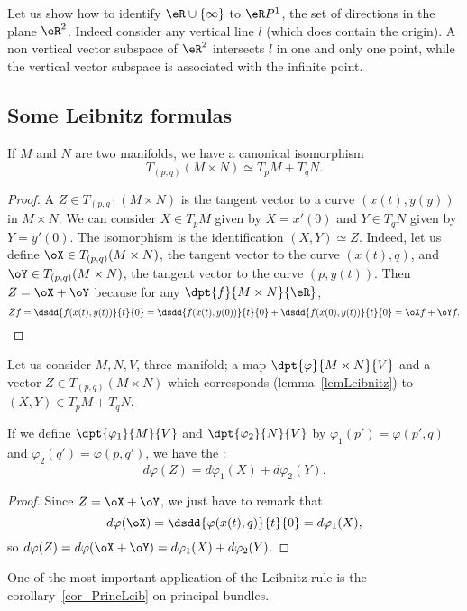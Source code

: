 Let us show how to identify $\eR\cup\{ \infty \}$ to $\eR P^1$, the set of directions in the plane $\eR^2$. Indeed consider any vertical line $l$ (which does contain the origin). A non vertical vector subspace of $\eR^2$ intersects $l$ in one and only one point, while the vertical vector subspace is associated with the infinite point.

\subsection{Some Leibnitz formulas}

\begin{lemma}
If $M$ and $N$ are two manifolds, we have a canonical isomorphism
\[
     T_{(p,q)}(M\times N)\simeq T_pM+T_qN.
\]
\label{lemLeibnitz}
\end{lemma}

\begin{proof}
A $Z\in T_{(p,q)}(M\times N)$ is the tangent vector to a curve $(x(t),y(y))$ in $M\times N$. We can consider $X\in T_pM$ given by $X=x'(0)$ and $Y\in T_qN$ given by $Y=y'(0)$. The isomorphism is the identification $(X,Y)\simeq Z$. Indeed, let us define $\oX\in T_{(p,q)}(M\times N)$, the tangent vector to the curve $(x(t),q)$, and $\oY\in T_{(p,q)}(M\times N)$, the tangent vector to the curve $(p,y(t))$. Then $Z=\oX+\oY$ because for any $\dpt{f}{M\times N}{\eR}$,
\begin{equation}
 Zf=\dsdd{f(x(t),y(t))}{t}{0}
   =\dsdd{f(x(t),y(0))}{t}{0}+\dsdd{f(x(0),y(t))}{t}{0}
   =\oX f+\oY f.
\end{equation}
\end{proof}

\begin{proposition} \label{Leibnitz}
Let us consider $M,N,V$, three manifold; a map $\dpt{\varphi}{M\times N}{V}$ and a vector $Z\in T_{(p,q)}(M\times N)$ which corresponds (lemma~\ref{lemLeibnitz}) to $(X,Y)\in T_pM+T_qN$.

If we define $\dpt{\varphi_1}{M}{V}$ and  $\dpt{\varphi_2}{N}{V}$ by $\varphi_1(p')=\varphi(p',q)$ and $\varphi_2(q')=\varphi(p,q')$, we have the :
\begin{equation}
    d\varphi(Z)=d\varphi_1(X)+d\varphi_2(Y).
\end{equation}
\end{proposition}
\begin{proof}
 Since $Z=\oX+\oY$, we just have to remark that
\[
                  d\varphi(\oX)=\dsdd{\varphi(x(t),q)}{t}{0}=d\varphi_1(X),
\]
so $d\varphi(Z)=d\varphi(\oX+\oY)=d\varphi_1(X)+d\varphi_2(Y)$.
\end{proof}
One of the most important application of the Leibnitz rule is the corollary~\ref{cor_PrincLeib} on principal bundles.


